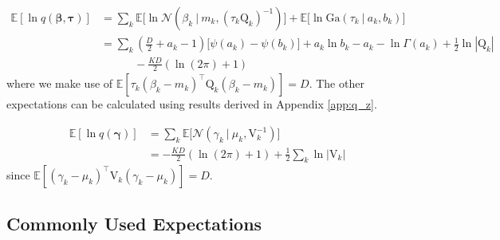\documentclass[twoside,11pt]{article}
\newcommand\given[1][]{\:#1\vert\:}
\newcommand{\transpose}[1]{#1^{\intercal}}
\newcommand{\ksum}{\sum\limits_{k}}
\newcommand{\boldbeta}{\boldsymbol\beta}
\newcommand{\boldgamma}{\boldsymbol\gamma}
\newcommand{\boldtau}{\boldsymbol\tau}
\newcommand{\E}{\mathbb{E}}
\begin{document}
\begin{equation} \label{eq:e6_deriv} %
\begin{split}
	\E[\ln q(\boldbeta, \boldtau)] &= \ksum \E \Big[ \ln \mathcal{N} \left( \beta_k \given m_k, (\tau_k \mathrm{Q}_k)^{-1}\right)\Big] + \E\Big[\ln \mathrm{Ga} \left( \tau_k \given a_k, b_k \right)\Big] \\
	&= \ksum \left( \frac{D}{2} + a_k - 1 \right) \big[\psi(a_k) - \psi(b_k) \big] + a_k \ln b_k - a_k - \ln \Gamma(a_k) + \frac{1}{2}\ln |\mathrm{Q}_{k}|\\
	& \quad \quad \quad -\frac{KD}{2} \left(  \ln(2\pi)  + 1\right)
\end{split}
\end{equation}
where we make use of $\E[\tau_k \transpose{(\beta_k - m_k)}\mathrm{Q}_k(\beta_k - m_k)] = D$. The other expectations can be calculated using results derived in Appendix \ref{app:q_z}.

\begin{equation} \label{eq:e7_deriv}
\begin{split}
	\E[\ln q(\boldgamma)] &= \ksum \E \Big[ \mathcal{N} \left( \gamma_k \given \mu_k, \mathrm{V}_{k}^{-1} \right)\Big] \\
	&= - \frac{KD}{2}(\ln (2\pi) + 1) + \frac{1}{2}\sum_{k} \ln|\mathrm{V}_k| 
\end{split}
\end{equation}
since $\E[\transpose{(\gamma_k - \mu_k)}\mathrm{V}_{k}(\gamma_k - \mu_k)] = D$.


\newpage




\begin{figure}
  \centering
\end{figure}



\newpage


\subsection{Commonly Used Expectations}
\end{document}
